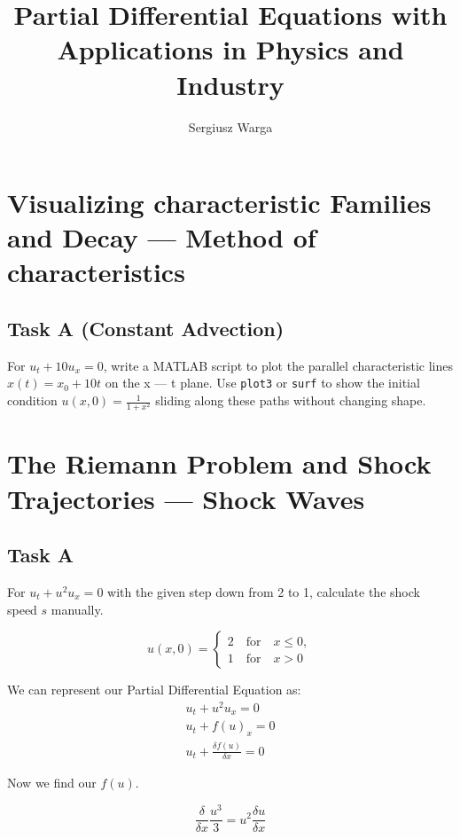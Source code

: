 \documentclass[a4paper]{article}
\author{Sergiusz Warga}
\title{Partial Differential Equations with Applications in Physics and Industry}
\begin{document}
\maketitle

\section{Visualizing characteristic Families and Decay --- Method of characteristics}

\subsection{Task A (Constant Advection)}

For $u_t + 10 u_x = 0$, write a MATLAB script to plot the parallel
characteristic lines $x(t) = x_0 + 10 t$ on the x --- t plane.
Use \texttt{plot3} or \texttt{surf} to show the initial condition
$u(x,0)=\frac{1}{1 + x^2}$ sliding along these paths without changing shape.

\section{The Riemann Problem and Shock Trajectories --- Shock Waves}

\subsection{Task A}

For $u_t + u^2 u_x = 0$ with the given step down from 2 to 1, calculate the shock speed $s$ manually.

\begin{equation}
  u(x, 0) = 
    \begin{cases}
    2 \quad \text{for} \quad x \le 0, \\
    1 \quad \text{for} \quad x > 0
    \end{cases}
\end{equation}

We can represent our Partial Differential Equation as:
\begin{align}
    u_t + u^2 u_x = 0 \\
    u_t + f(u)_x = 0 \\
    u_t + \frac{\delta f(u)}{\delta x} = 0
\end{align}

Now we find our $f(u)$.

\begin{equation}
  \frac{\delta}{\delta x}\frac{u^3}{3} = u^2 \frac{\delta u}{\delta x}
\end{equation}
\end{document}
